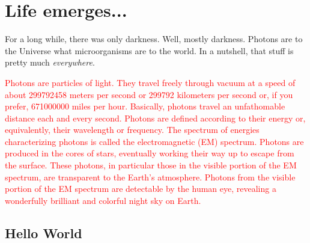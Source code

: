 \documentclass[main.tex]{subfiles}
\begin{document}
\chapter{Life emerges...}

\par \nar For a long while, there was only darkness.  Well, mostly darkness.  Photons are to the Universe what microorganisms are to the world.  In a nutshell, that stuff is pretty much \textit{everywhere}.


\begin{tcolorbox}[sharp corners, colback=red!30, colframe=red!80!blue, title=Photons]
\par \textcolor{red} {Photons are particles of light.  They travel freely through vacuum at a speed of about 299792458 meters per second or 299792 kilometers per second or, if you prefer, 671000000 miles per hour.  Basically, photons travel an unfathomable distance each and every second.  Photons are defined according to their energy or, equivalently, their wavelength or frequency.  The spectrum of energies characterizing photons is called the electromagnetic (EM) spectrum.  Photons are produced in the cores of stars, eventually working their way up to escape from the surface.  These photons, in particular those in the visible portion of the EM spectrum, are transparent to the Earth's atmosphere.  Photons from the visible portion of the EM spectrum are detectable by the human eye, revealing a wonderfully brilliant and colorful night sky on Earth.}
\end{tcolorbox}

\section{Hello World} \label{hello}
\end{document}
